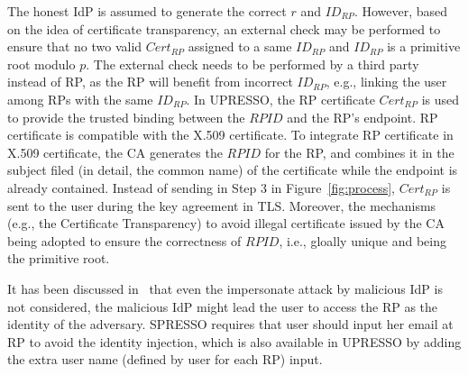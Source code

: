  The honest IdP is assumed to generate the correct $r$ and $ID_{RP}$. 
However, based on the idea of certificate transparency, 
an external check may be performed to ensure that  no two valid $Cert_{RP}$ assigned to a same $ID_{RP}$ and $ID_{RP}$ is a primitive root modulo $p$.
The external check needs to be performed by a third party instead of RP, as the RP will benefit from incorrect $ID_{RP}$, e.g., linking the user among RPs with the same  $ID_{RP}$. 
In UPRESSO, the RP certificate $Cert_{RP}$ is used to provide the trusted binding between the $RPID$ and the RP's endpoint. RP certificate is compatible with the X.509 certificate. To integrate RP certificate in X.509 certificate, the CA generates the $RPID$ for the RP, and combines it in the subject  filed (in detail, the common name)  of the certificate while the endpoint is already contained. Instead of sending  in Step 3 in Figure~\ref{fig:process}, $Cert_{RP}$  is sent to the user during the key agreement in TLS. Moreover, the mechanisms (e.g., the Certificate Transparency) to avoid illegal certificate issued by the CA being adopted to ensure the correctness of $RPID$, i.e., gloally unique and being the primitive root.



 It has been discussed in~\cite{SPRESSO} that even the impersonate attack by malicious IdP is not considered, the malicious IdP might lead the user to access the RP as the identity of the adversary. SPRESSO requires that user should input her email at RP to avoid the identity injection, which is also available in UPRESSO by adding the extra user name (defined by user for each RP) input.
